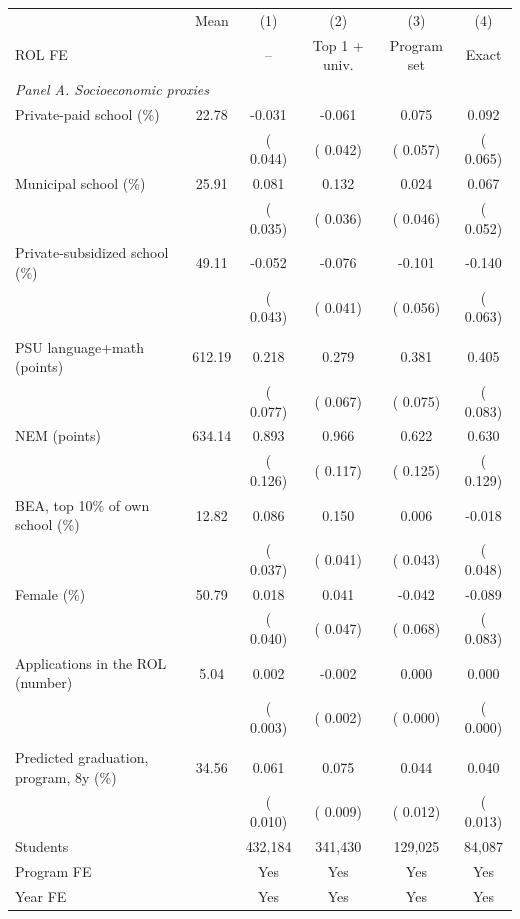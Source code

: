 \begin{tabular}{lccccc}
\toprule
 & Mean & (1) & (2) & (3) & (4) \\
ROL FE & & -- & Top 1 + univ. & Program set & Exact \\
\midrule
\multicolumn{6}{l}{\textit{Panel A. Socioeconomic proxies}} \\
Private-paid school (\%) &  22.78 &  -0.031 &  -0.061 &   0.075 &   0.092 \\
 & & ( 0.044) & ( 0.042) & ( 0.057) & ( 0.065) \\
Municipal school (\%) &  25.91 &   0.081\sym{**} &   0.132\sym{***} &   0.024 &   0.067 \\
 & & ( 0.035) & ( 0.036) & ( 0.046) & ( 0.052) \\
Private-subsidized school (\%) &  49.11 &  -0.052 &  -0.076\sym{*} &  -0.101\sym{*} &  -0.140\sym{**} \\
 & & ( 0.043) & ( 0.041) & ( 0.056) & ( 0.063) \\
\addlinespace
\multicolumn{6}{l}{\textit{Panel B. Achievement and other predetermined}} \\
PSU language+math (points) & 612.19 &   0.218\sym{***} &   0.279\sym{***} &   0.381\sym{***} &   0.405\sym{***} \\
 & & ( 0.077) & ( 0.067) & ( 0.075) & ( 0.083) \\
NEM (points) & 634.14 &   0.893\sym{***} &   0.966\sym{***} &   0.622\sym{***} &   0.630\sym{***} \\
 & & ( 0.126) & ( 0.117) & ( 0.125) & ( 0.129) \\
BEA, top 10\% of own school (\%) &  12.82 &   0.086\sym{**} &   0.150\sym{***} &   0.006 &  -0.018 \\
 & & ( 0.037) & ( 0.041) & ( 0.043) & ( 0.048) \\
Female (\%) &  50.79 &   0.018 &   0.041 &  -0.042 &  -0.089 \\
 & & ( 0.040) & ( 0.047) & ( 0.068) & ( 0.083) \\
Applications in the ROL (number) &   5.04 &   0.002 &  -0.002 &   0.000 &   0.000 \\
 & & ( 0.003) & ( 0.002) & ( 0.000) & ( 0.000) \\
\addlinespace
\multicolumn{6}{l}{\textit{Joint test: all covariates above}} \\
Predicted graduation, program, 8y (\%) &  34.56 &   0.061\sym{***} &   0.075\sym{***} &   0.044\sym{***} &   0.040\sym{***} \\
 & & ( 0.010) & ( 0.009) & ( 0.012) & ( 0.013) \\
\midrule
Students & &   432,184 &   341,430 &   129,025 &    84,087 \\
Program FE & & Yes & Yes & Yes & Yes \\
Year FE & & Yes & Yes & Yes & Yes \\
\bottomrule
\end{tabular}
